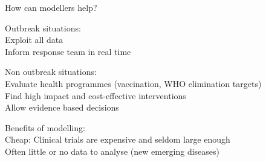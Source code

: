 \documentclass[table]{beamer}\usepackage[]{graphicx}\usepackage[]{color}
\begin{document}
\begin{frame}[fragile]{How can modellers help?}

Outbreak situations: \\
\vspace{0.1cm}
\hspace{0.5cm} Exploit all data \\
\vspace{0.1cm}
\hspace{0.5cm} Inform response team in real time \\
\vspace{0.3cm}

Non outbreak situations: \\
\vspace{0.1cm}
\hspace{0.5cm} Evaluate health programmes (vaccination, WHO elimination targets) \\ %
\vspace{0.1cm}
\hspace{0.5cm} Find high impact and cost-effective interventions \\
\vspace{0.1cm}
\hspace{0.5cm} Allow evidence based decisions \\
\vspace{0.3cm}

Benefits of modelling: \\
\vspace{0.1cm}
\hspace{0.5cm} Cheap: Clinical trials are expensive and seldom large enough \\
\vspace{0.1cm}
\hspace{0.5cm} Often little or no data to analyse (new emerging diseases) \\ %
\vspace{0.3cm}



\end{frame}
\end{document}
